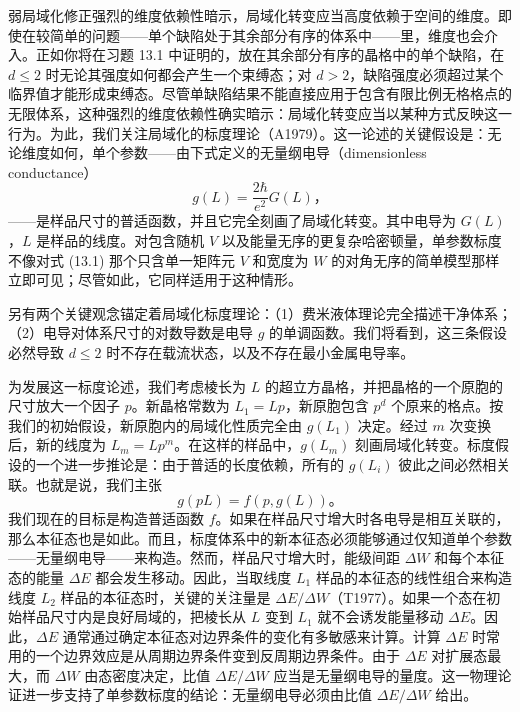 弱局域化修正强烈的维度依赖性暗示，局域化转变应当高度依赖于空间的维度。即使在较简单的问题——单个缺陷处于其余部分有序的体系中——里，维度也会介入。正如你将在习题 13.1 中证明的，放在其余部分有序的晶格中的单个缺陷，在 $d\leq 2$ 时无论其强度如何都会产生一个束缚态；对 $d>2$，缺陷强度必须超过某个临界值才能形成束缚态。尽管单缺陷结果不能直接应用于包含有限比例无格格点的无限体系，这种强烈的维度依赖性确实暗示：局域化转变应当以某种方式反映这一行为。为此，我们关注局域化的标度理论（A1979）。这一论述的关键假设是：无论维度如何，单个参数——由下式定义的无量纲电导（dimensionless conductance）
\begin{equation*}
g(L)=\frac{2\hbar}{e^{2}}G(L)\text{，}\tag{13.23}
\end{equation*}
——是样品尺寸的普适函数，并且它完全刻画了局域化转变。其中电导为 $G(L)$，$L$ 是样品的线度。对包含随机 $V$ 以及能量无序的更复杂哈密顿量，单参数标度不像对式 (13.1) 那个只含单一矩阵元 $V$ 和宽度为 $W$ 的对角无序的简单模型那样立即可见；尽管如此，它同样适用于这种情形。

另有两个关键观念锚定着局域化标度理论：（1）费米液体理论完全描述干净体系；（2）电导对体系尺寸的对数导数是电导 $g$ 的单调函数。我们将看到，这三条假设必然导致 $d\leq 2$ 时不存在载流状态，以及不存在最小金属电导率。

为发展这一标度论述，我们考虑棱长为 $L$ 的超立方晶格，并把晶格的一个原胞的尺寸放大一个因子 $p$。新晶格常数为 $L_{1}=Lp$，新原胞包含 $p^{d}$ 个原来的格点。按我们的初始假设，新原胞内的局域化性质完全由 $g(L_{1})$ 决定。经过 $m$ 次变换后，新的线度为 $L_{m}=Lp^{m}$。在这样的样品中，$g(L_{m})$ 刻画局域化转变。标度假设的一个进一步推论是：由于普适的长度依赖，所有的 $g(L_{i})$ 彼此之间必然相关联。也就是说，我们主张
\begin{equation*}
g(pL)=f(p,g(L))\text{。}\tag{13.24}
\end{equation*}
我们现在的目标是构造普适函数 $f$。如果在样品尺寸增大时各电导是相互关联的，那么本征态也是如此。而且，标度体系中的新本征态必须能够通过仅知道单个参数——无量纲电导——来构造。然而，样品尺寸增大时，能级间距 $\Delta W$ 和每个本征态的能量 $\Delta E$ 都会发生移动。因此，当取线度 $L_{1}$ 样品的本征态的线性组合来构造线度 $L_{2}$ 样品的本征态时，关键的关注量是 $\Delta E/\Delta W$（T1977）。如果一个态在初始样品尺寸内是良好局域的，把棱长从 $L$ 变到 $L_{1}$ 就不会诱发能量移动 $\Delta E$。因此，$\Delta E$ 通常通过确定本征态对边界条件的变化有多敏感来计算。计算 $\Delta E$ 时常用的一个边界效应是从周期边界条件变到反周期边界条件。由于 $\Delta E$ 对扩展态最大，而 $\Delta W$ 由态密度决定，比值 $\Delta E/\Delta W$ 应当是无量纲电导的量度。这一物理论证进一步支持了单参数标度的结论：无量纲电导必须由比值 $\Delta E/\Delta W$ 给出。


